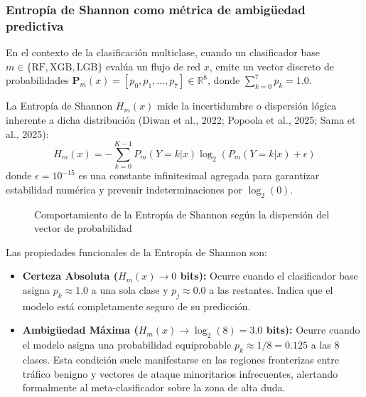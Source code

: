 \subsubsection{Entropía de Shannon como métrica de ambigüedad predictiva}
En el contexto de la clasificación multiclase, cuando un clasificador base $m \in \{\mathrm{RF}, \mathrm{XGB}, \mathrm{LGB}\}$ evalúa un flujo de red $x$, emite un vector discreto de probabilidades $\mathbf{P}_m(x) = [p_0, p_1, \dots, p_7] \in \mathbb{R}^8$, donde $\sum_{k=0}^7 p_k = 1.0$.

La Entropía de Shannon $H_m(x)$ mide la incertidumbre o dispersión lógica inherente a dicha distribución (Diwan et al., 2022; Popoola et al., 2025; Sama et al., 2025):
\begin{equation}
H_m(x) = -\sum_{k=0}^{K-1} P_m(Y=k|x) \log_2 \left( P_m(Y=k|x) + \epsilon \right)
\end{equation}
donde $\epsilon = 10^{-15}$ es una constante infinitesimal agregada para garantizar estabilidad numérica y prevenir indeterminaciones por $\log_2(0)$.

\begin{figure}[H]
\centering
\caption{Comportamiento de la Entropía de Shannon según la dispersión del vector de probabilidad}
\label{fig:entropia_comportamiento}
\end{figure}

Las propiedades funcionales de la Entropía de Shannon son:
\begin{itemize}
    \item \textbf{Certeza Absoluta ($H_m(x) \to 0$ bits):} Ocurre cuando el clasificador base asigna $p_k \approx 1.0$ a una sola clase y $p_j \approx 0.0$ a las restantes. Indica que el modelo está completamente seguro de su predicción.
    \item \textbf{Ambigüedad Máxima ($H_m(x) \to \log_2(8) = 3.0$ bits):} Ocurre cuando el modelo asigna una probabilidad equiprobable $p_k \approx 1/8 = 0.125$ a las 8 clases. Esta condición suele manifestarse en las regiones fronterizas entre tráfico benigno y vectores de ataque minoritarios infrecuentes, alertando formalmente al meta-clasificador sobre la zona de alta duda.
\end{itemize}

